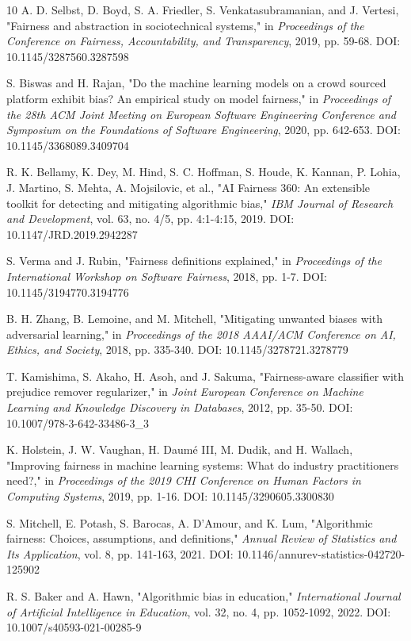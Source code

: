 \documentclass[10pt,journal,compsoc]{IEEEtran}
\begin{document}
\begin{thebibliography}{10}
A. D. Selbst, D. Boyd, S. A. Friedler, S. Venkatasubramanian, and J. Vertesi, "Fairness and abstraction in sociotechnical systems," in \textit{Proceedings of the Conference on Fairness, Accountability, and Transparency}, 2019, pp. 59-68. DOI: 10.1145/3287560.3287598

S. Biswas and H. Rajan, "Do the machine learning models on a crowd sourced platform exhibit bias? An empirical study on model fairness," in \textit{Proceedings of the 28th ACM Joint Meeting on European Software Engineering Conference and Symposium on the Foundations of Software Engineering}, 2020, pp. 642-653. DOI: 10.1145/3368089.3409704

R. K. Bellamy, K. Dey, M. Hind, S. C. Hoffman, S. Houde, K. Kannan, P. Lohia, J. Martino, S. Mehta, A. Mojsilovic, et al., "AI Fairness 360: An extensible toolkit for detecting and mitigating algorithmic bias," \textit{IBM Journal of Research and Development}, vol. 63, no. 4/5, pp. 4:1-4:15, 2019. DOI: 10.1147/JRD.2019.2942287

S. Verma and J. Rubin, "Fairness definitions explained," in \textit{Proceedings of the International Workshop on Software Fairness}, 2018, pp. 1-7. DOI: 10.1145/3194770.3194776

B. H. Zhang, B. Lemoine, and M. Mitchell, "Mitigating unwanted biases with adversarial learning," in \textit{Proceedings of the 2018 AAAI/ACM Conference on AI, Ethics, and Society}, 2018, pp. 335-340. DOI: 10.1145/3278721.3278779

T. Kamishima, S. Akaho, H. Asoh, and J. Sakuma, "Fairness-aware classifier with prejudice remover regularizer," in \textit{Joint European Conference on Machine Learning and Knowledge Discovery in Databases}, 2012, pp. 35-50. DOI: 10.1007/978-3-642-33486-3\_3

K. Holstein, J. W. Vaughan, H. Daumé III, M. Dudik, and H. Wallach, "Improving fairness in machine learning systems: What do industry practitioners need?," in \textit{Proceedings of the 2019 CHI Conference on Human Factors in Computing Systems}, 2019, pp. 1-16. DOI: 10.1145/3290605.3300830

S. Mitchell, E. Potash, S. Barocas, A. D'Amour, and K. Lum, "Algorithmic fairness: Choices, assumptions, and definitions," \textit{Annual Review of Statistics and Its Application}, vol. 8, pp. 141-163, 2021. DOI: 10.1146/annurev-statistics-042720-125902

R. S. Baker and A. Hawn, "Algorithmic bias in education," \textit{International Journal of Artificial Intelligence in Education}, vol. 32, no. 4, pp. 1052-1092, 2022. DOI: 10.1007/s40593-021-00285-9


\end{thebibliography}
\end{document}
